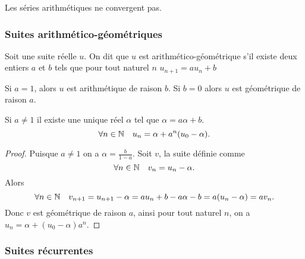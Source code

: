 Les séries arithmétiques ne convergent pas.

\subsubsection{Suites arithmético-géométriques}

\begin{defdef}
  Soit une suite réelle \(u\). On dit que \(u\) est arithmético-géométrique s'il existe deux entiers \(a\) et \(b\) tels que pour tout naturel \(n\) \(u_{n+1} = au_n +b\)
\end{defdef}

Si \(a = 1\), alors \(u\) est arithmétique de raison \(b\). Si \(b = 0\) alors \(u\) est géométrique de raison \(a\).

\begin{prop}
  Si \(a\neq 1\) il existe une unique réel \(\alpha\) tel que \(\alpha = a\alpha+b\). %
  \begin{equation}
    \forall n \in \mathbb{N} \quad u_n = \alpha + a^{n}(u_0-\alpha).
  \end{equation}
\end{prop}
\begin{proof}
  Puisque \(a \neq 1\) on a \(\alpha = \frac{b}{1-a}\). Soit \(v\), la suite définie comme
  \begin{equation}
    \forall n \in \mathbb{N} \quad v_n = u_n -\alpha.
  \end{equation}
Alors
\begin{equation}
  \forall n \in \mathbb{N} \quad v_{n+1} = u_{n+1}-\alpha = a u_n +b - a\alpha -b = a(u_n-\alpha) = a v_n.
\end{equation}
Donc \(v\) est géométrique de raison \(a\), ainsi pour tout naturel \(n\), on a \(u_n = \alpha + (u_0-\alpha)a^n\).
\end{proof}

\subsubsection{Suites récurrentes}

